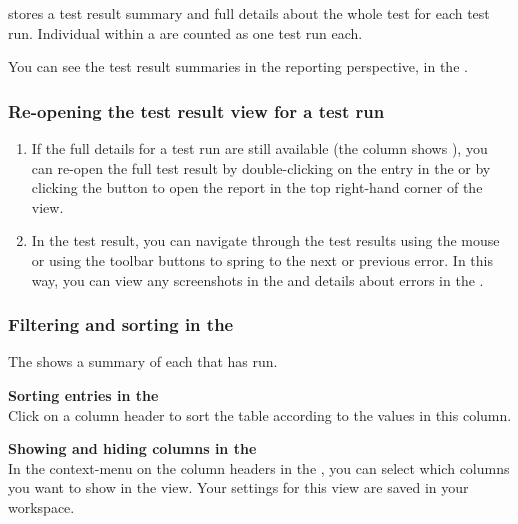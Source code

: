 \jb{} stores a test result summary and full details about the whole test for each test run. Individual \gdsuites{} within a \gdjob{} are counted as one test run each. 

You can see the test result summaries in the \jb{} reporting perspective, in the \gdtestsummaryview{}. 

\subsubsection{Re-opening the test result view for a test run}
\label{TasksReopenTestResult}
\begin{enumerate}
\item If the full details for a test run are still available (the column  shows ), you can re-open the full test result by double-clicking on the entry in the \gdtestsummaryview{} or by clicking the button to open the report in the top right-hand corner of the view. 
\item In the test result, you can navigate through the test results using the mouse or using the toolbar buttons to spring to the next or previous error. In this way, you can view any screenshots in the \gdimgview{} and details about errors in the \gdpropview{}.
\end{enumerate}

\subsubsection{Filtering and sorting in the \gdtestsummaryview{}}

The \gdtestsummaryview{} shows a summary of each \gdsuite{} that has run. 

\textbf{Sorting entries in the \gdtestsummaryview}\\

Click on a column header to sort the table according to the values in this column. 

\textbf{Showing and hiding columns in the \gdtestsummaryview}\\

In the context-menu on the column headers in the \gdtestsummaryview{}, you can select which columns you want to show in the view. Your settings for this view are saved in your workspace. 

